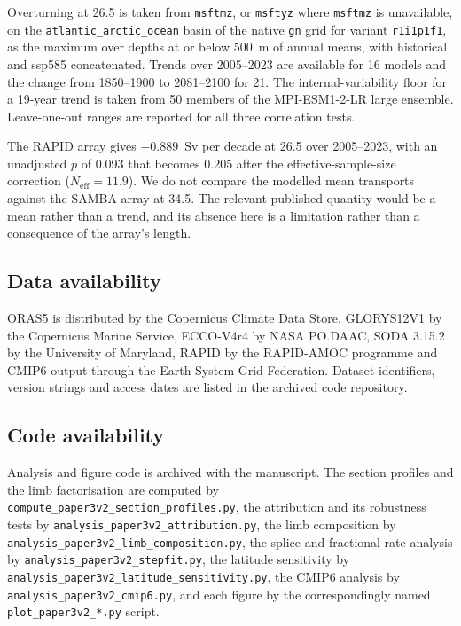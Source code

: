 Overturning at 26.5\degN{} is taken from \texttt{msftmz}, or \texttt{msftyz}
where \texttt{msftmz} is unavailable, on the \texttt{atlantic\_arctic\_ocean}
basin of the native \texttt{gn} grid for variant \texttt{r1i1p1f1}, as the maximum over depths at or below 500~m of annual means,
with historical and ssp585 concatenated. Trends over 2005--2023 are available
for 16 models and the change from 1850--1900 to 2081--2100 for 21. The
internal-variability floor for a 19-year trend is taken from 50 members of the
MPI-ESM1-2-LR large ensemble. Leave-one-out ranges are reported for all three
correlation tests.

The RAPID array\cite{Cunningham2007} gives $-0.889$~Sv per decade at
26.5\degN{} over 2005--2023, with an unadjusted $p$ of 0.093 that becomes 0.205
after the effective-sample-size correction ($N_{\text{eff}}=11.9$). We do not compare the modelled mean transports against
the SAMBA array at 34.5\degS{}\cite{Meinen2018,FrajkaWilliams2019}. The
relevant published quantity would be a mean rather than a trend, and its absence
here is a limitation rather than a consequence of the array's length.

\subsection*{Data availability}

ORAS5 is distributed by the Copernicus Climate Data Store, GLORYS12V1 by the
Copernicus Marine Service, ECCO-V4r4 by NASA PO.DAAC, SODA 3.15.2 by the
University of Maryland, RAPID by the RAPID-AMOC programme and CMIP6 output
through the Earth System Grid Federation. Dataset identifiers, version strings
and access dates are listed in the archived code repository.

\subsection*{Code availability}

Analysis and figure code is archived with the manuscript. The section profiles
and the limb factorisation are computed by
\texttt{compute\_paper3v2\_section\_profiles.py}, the attribution and its
robustness tests by \texttt{analysis\_paper3v2\_attribution.py}, the limb
composition by \texttt{analysis\_paper3v2\_limb\_composition.py}, the splice and
fractional-rate analysis by \texttt{analysis\_paper3v2\_stepfit.py}, the latitude
sensitivity by \texttt{analysis\_paper3v2\_latitude\_sensitivity.py}, the CMIP6
analysis by \texttt{analysis\_paper3v2\_cmip6.py}, and each figure by the
correspondingly named \texttt{plot\_paper3v2\_*.py} script.

